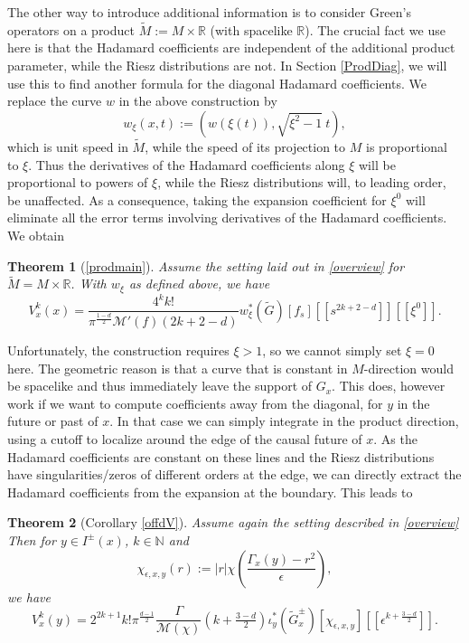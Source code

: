 \documentclass[11pt]{article}
\def\R{{\mathbb{R}}}
\def\N{{\mathbb{N}}}
\def\M{\mathcal{M}}
\newtheorem*{thm*}{Theorem}
\begin{document}
The other way to introduce additional information is to consider Green's operators on a product $\tilde M:= M\times \R$ (with spacelike $\R$). The crucial fact we use here is that the Hadamard coefficients are independent of the additional product parameter, while the Riesz distributions are not. In Section \ref{ProdDiag}, we will use this to find another formula for the diagonal Hadamard coefficients. We replace the curve $w$ in the above construction by 
\[w_\xi(x,t):=(w(\xi(t)),\sqrt{\xi^2-1}\ t),\]
which is unit speed in $\tilde M$, while the speed of its projection to $M$ is proportional to $\xi$. Thus the derivatives of the Hadamard coefficients along $\xi$ will be proportional to powers of $\xi$, while the Riesz distributions will, to leading order, be unaffected. As a consequence,  taking the expansion coefficient for $\xi^0$ will eliminate all the error terms involving derivatives of the Hadamard coefficients. We obtain
\begin{thm*}[\ref{prodmain}]
Assume the setting laid out in \ref{overview} for $\tilde M=M\times\R$. With $w_\xi$ as defined above, we have
\[V^k_x(x)=\frac{4^k k!}{\pi^{\frac{1-d}{2}}\M'(f)(2k+2-d)}w_\xi^*(\tilde G)[f_s][[s^{2k+2-d}]][[\xi^0]].\]
\end{thm*}
Unfortunately, the construction requires $\xi >1$, so we cannot simply set $\xi=0$ here. The geometric reason is that a curve that is constant in $M$-direction would be spacelike and thus immediately leave the support of $G_x$.
This does, however work if we want to compute coefficients away from the diagonal, for $y$ in the future or past of $x$. In that case we can simply integrate in the product direction, using a cutoff to localize around the edge of the causal future of $x$. As the Hadamard coefficients are constant on these lines and the Riesz distributions have singularities/zeros of different orders at the edge, we can directly extract the Hadamard coefficients from the expansion at the boundary.
This leads to
\begin{thm*}[Corollary \ref{offdV}]
	Assume again the setting described in \ref{overview}
	Then for $y\in I^\pm(x)$, $k\in \N$ and
	\[\chi_{\epsilon,x,y}(r):=|r|\chi\left(\frac{\Gamma_x(y)-r^2}{\epsilon}\right),\] we have
	\[V^k_x(y)=2^{2k+1}k!\pi^{\tfrac{d-1}{2}}\frac{\Gamma}{\M(\chi)}(k+\tfrac{3-d}{2})\iota_y^*(\tilde G^\pm_x)[\chi_{\epsilon,x,y}][[\epsilon^{k+\tfrac{3-d}{2}}]].\]
\end{thm*}
\end{document}
